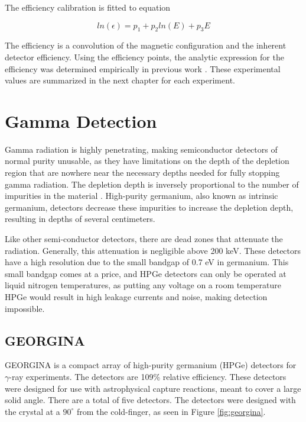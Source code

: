 

The efficiency calibration is fitted to equation

\begin{equation}
    ln(\epsilon) = p_1+p_2ln(E)+p_3E
    \label{eq:SiLi_Eff}
\end{equation}

The efficiency is a convolution of the magnetic configuration and the inherent detector efficiency. Using the efficiency points, the analytic expression for the efficiency was determined empirically in previous work \citep{battaglia15:_iceball_176lu}. These experimental values are summarized in the next chapter for each experiment.

\section{Gamma Detection}

Gamma radiation is highly penetrating, making semiconductor detectors of normal purity unusable, as they have limitations on the depth of the depletion region that are nowhere near the necessary depths needed for fully stopping gamma radiation. The depletion depth is inversely proportional to the number of impurities in the material \citep{knoll00:rad_det_meas}. High-purity germanium, also known as intrinsic germanium, detectors decrease these impurities to increase the depletion depth, resulting in depths of several centimeters.

Like other semi-conductor detectors, there are dead zones that attenuate the radiation. Generally, this attenuation is negligible above 200 keV. These detectors have a high resolution due to the small bandgap of 0.7 eV in germanium. This small bandgap comes at a price, and HPGe detectors can only be operated at liquid nitrogen temperatures, as putting any voltage on a room temperature HPGe would result in high leakage currents and noise, making detection impossible.

\subsection{GEORGINA}

GEORGINA is a compact array of high-purity germanium (HPGe) detectors for $\gamma$-ray experiments\citep{isnap18:_georgina}. The detectors are 109\% relative efficiency. These detectors were designed for use with astrophysical capture reactions, meant to cover a large solid angle. There are a total of five detectors. The detectors were designed with the crystal at a $90^{\circ}$ from the cold-finger, as seen in Figure \ref{fig:georgina}.


